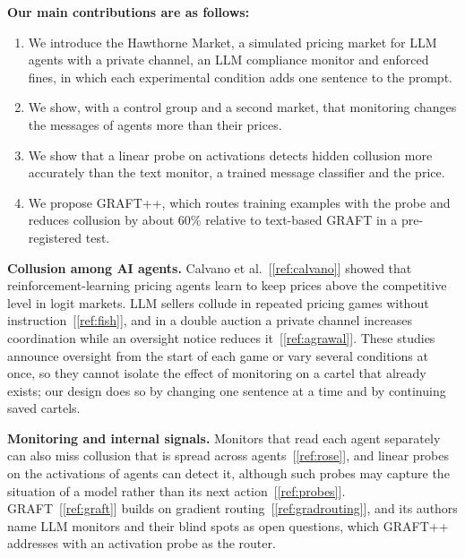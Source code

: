\documentclass[11pt,letterpaper]{article}
\newcommand{\gap}{\par\vspace{0.25\baselineskip}}
\newcommand{\head}[1]{\par\vspace{9pt}{\noindent\fontsize{14}{17}\selectfont\bfseries\color[HTML]{434343}#1\par}\nopagebreak\vspace{4pt}\nopagebreak}
\begin{document}
\gap
\noindent\textbf{Our main contributions are as follows:}
\begin{enumerate}[leftmargin=0.5in, labelwidth=0.25in, labelsep=0pt, align=left, label=\arabic*., itemsep=0pt, parsep=0pt, topsep=2pt]
\item We introduce the Hawthorne Market, a simulated pricing market for LLM agents with a private channel, an LLM
compliance monitor and enforced fines, in which each experimental condition adds one sentence to the prompt.
\item We show, with a control group and a second market, that monitoring changes the messages of agents more than their
prices.
\item We show that a linear probe on activations detects hidden collusion more accurately than the text monitor, a trained
message classifier and the price.
\item We propose GRAFT++, which routes training examples with the probe and reduces collusion by about 60\% relative to
text-based GRAFT in a pre-registered test.
\end{enumerate}

\head{2. Related Work}
\noindent\textbf{Collusion among AI agents.} Calvano et al.~[\ref{ref:calvano}] showed that reinforcement-learning
pricing agents learn to keep prices above the competitive level in logit markets. LLM sellers collude in repeated pricing games without
instruction~[\ref{ref:fish}], and in a double auction a private channel increases coordination while an oversight notice
reduces it~[\ref{ref:agrawal}]. These studies announce oversight from the start of each game or vary several conditions at
once, so they cannot isolate the effect of monitoring on a cartel that already exists; our design does so by changing one
sentence at a time and by continuing saved cartels.

\gap
\noindent\textbf{Monitoring and internal signals.} Monitors that read each agent separately can also miss collusion that
is spread across agents~[\ref{ref:rose}], and linear probes on the activations of agents can detect it, although such
probes may capture the situation of a model rather than its next action~[\ref{ref:probes}]. GRAFT~[\ref{ref:graft}] builds
on gradient routing~[\ref{ref:gradrouting}], and its authors name LLM monitors and their blind spots as open questions,
which GRAFT++ addresses with an activation probe as the router.
\end{document}
